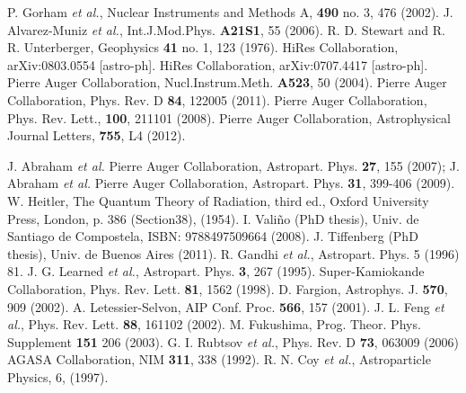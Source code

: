 \begin{thebibliography}{1}
  P. Gorham {\it et al.}, Nuclear Instruments and Methods A, \textbf{490} no. 3,  476 (2002).
 J. Alvarez-Muniz {\it et al.}, Int.J.Mod.Phys. \textbf{A21S1}, 55 (2006).
 R. D. Stewart and R. R. Unterberger, Geophysics \textbf{41} no. 1, 123 (1976).
 HiRes Collaboration, arXiv:0803.0554 [astro-ph].
 HiRes Collaboration, arXiv:0707.4417 [astro-ph].
 Pierre Auger Collaboration, Nucl.Instrum.Meth. \textbf{A523},  50 (2004).
 Pierre Auger Collaboration, Phys. Rev. D \textbf{84}, 122005 (2011).
 Pierre Auger Collaboration, Phys. Rev. Lett., \textbf{100}, 211101 (2008).
 Pierre Auger Collaboration, Astrophysical Journal Letters, \textbf{755}, L4 (2012).

J. Abraham {\it et al.} Pierre Auger Collaboration, Astropart. Phys. \textbf{27}, 155 (2007);
J. Abraham {\it et al.} Pierre Auger Collaboration, Astropart. Phys. {\bf 31}, 399-406 (2009).
 W. Heitler, The Quantum Theory of Radiation, third ed., Oxford University Press, London, p. 386 (Section38), (1954).
 I. Vali\~no (PhD thesis), Univ. de Santiago de Compostela, ISBN: 9788497509664 (2008).
 J. Tiffenberg (PhD thesis), Univ. de Buenos Aires (2011).
 R. Gandhi {\it et al.}, Astropart. Phys. 5 (1996) 81.
 J. G. Learned {\it et al.}, Astropart. Phys. \textbf{3}, 267 (1995).
 Super-Kamiokande Collaboration, Phys. Rev. Lett. \textbf{81}, 1562 (1998). 
 D. Fargion, Astrophys. J. \textbf{570}, 909 (2002).
 A. Letessier-Selvon, AIP Conf. Proc. \textbf{566}, 157 (2001).
 J. L. Feng {\it et al.}, Phys. Rev. Lett. \textbf{88}, 161102 (2002).
 M. Fukushima, Prog. Theor. Phys. Supplement \textbf{151} 206 (2003). 
 G. I. Rubtsov {\it et al.}, Phys. Rev. D \textbf{73}, 063009 (2006)
 AGASA Collaboration, NIM \textbf{311}, 338 (1992).
 R. N. Coy {\it et al.}, Astroparticle Physics, 6, (1997).


\end{thebibliography}
